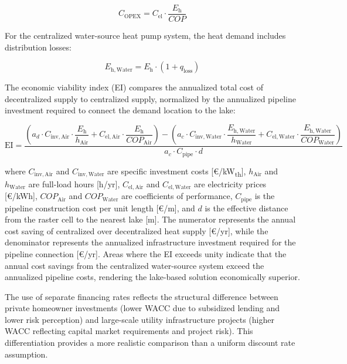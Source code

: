 \begin{equation}
C_\mathrm{OPEX} = C_\mathrm{el} \cdot \frac{E_\mathrm{h}}{COP}
\end{equation}

For the centralized water-source heat pump system, the heat demand includes distribution losses:

\begin{equation}
E_\mathrm{h,Water} = E_\mathrm{h} \cdot (1 + q_\mathrm{loss})
\end{equation}

The economic viability index (EI) compares the annualized total cost of decentralized supply to centralized supply, normalized by the annualized pipeline investment required to connect the demand location to the lake:

\begin{equation}
\mathrm{EI} = \frac{
\left( a_d \cdot C_\mathrm{inv,Air} \cdot \dfrac{E_\mathrm{h}}{h_\mathrm{Air}} + C_\mathrm{el,Air} \cdot \dfrac{E_\mathrm{h}}{COP_\mathrm{Air}} \right)
- \left( a_c \cdot C_\mathrm{inv,Water} \cdot \dfrac{E_\mathrm{h,Water}}{h_\mathrm{Water}} + C_\mathrm{el,Water} \cdot \dfrac{E_\mathrm{h,Water}}{COP_\mathrm{Water}} \right)

}{a_c \cdot C_\mathrm{pipe} \cdot d}
\label{eq:EI}
\end{equation}

\noindent where $C_\mathrm{inv,Air}$ and $C_\mathrm{inv,Water}$ are specific investment costs [€/kW\textsubscript{th}], $h_\mathrm{Air}$ and $h_\mathrm{Water}$ are full-load hours [h/yr], $C_\mathrm{el,Air}$ and $C_\mathrm{el,Water}$ are electricity prices [€/kWh], $COP_\mathrm{Air}$ and $COP_\mathrm{Water}$ are coefficients of performance, $C_\mathrm{pipe}$ is the pipeline construction cost per unit length [€/m], and $d$ is the effective distance from the raster cell to the nearest lake [m]. The numerator represents the annual cost saving of centralized over decentralized heat supply [€/yr], while the denominator represents the annualized infrastructure investment required for the pipeline connection [€/yr]. Areas where the EI exceeds unity indicate that the annual cost savings from the centralized water-source system exceed the annualized pipeline costs, rendering the lake-based solution economically superior.

The use of separate financing rates reflects the structural difference between private homeowner investments (lower WACC due to subsidized lending and lower risk perception) and large-scale utility infrastructure projects (higher WACC reflecting capital market requirements and project risk). This differentiation provides a more realistic comparison than a uniform discount rate assumption.

